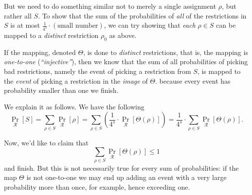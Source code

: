 But we need to do something similar not to merely a single assignment \( \rho \), but rather all \( S \).
To show that the sum of the probabilities of \emph{all} of the restrictions in \( S \) is at most 
\(\frac{1}{4^s} \cdot (\text{small number})\), we can try showing that \emph{each} \( \rho \in S \) can be mapped to a 
\emph{distinct} restriction \( \rho_0 \) as above. 

If the mapping, denoted \( \Theta \), is done to \emph{distinct} restrictions, that is, the mapping is 
\emph{one-to-one} (\emph{``injective''}), then we know that the sum of all probabilities of picking bad restrictions, 
namely the event of picking a restriction from \( S \), is mapped to the \emph{event} of picking a restriction in the 
\emph{image} of \( \Theta \).
because every event has probability smaller than one we finish. 

We explain it as follows. We have the following 
\[
\Pr_{\mathcal{R}}[S] = \sum_{\rho \in S} \Pr_{\mathcal{R}}[\rho] = 
\sum_{\rho \in S} \left(\frac{1}{4^s} \cdot \Pr_{\mathcal{R}}[\Theta(\rho)]\right) =
\frac{1}{4^s} \cdot \sum_{\rho \in S} \Pr_{\mathcal{R}}[\Theta(\rho)].
\]

Now, we'd like to claim that 
\[
\sum_{\rho \in S} \Pr_{\mathcal{R}}[\Theta(\rho)] \leq 1
\]
and finish. But this is not necessarily true for every sum of probabilities: if the map \( \Theta \) is 
not one-to-one we may end up adding an event with a very large probability more than once, for example, 
hence exceeding one.  




